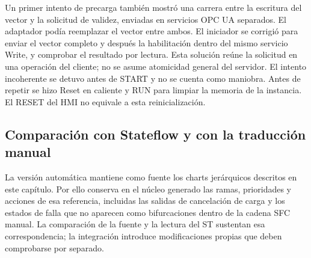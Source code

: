 \documentclass[a4paper,10pt,onecolumn,journal]{ieeeconf}
\numberwithin{equation}{section}
\begin{document}
Un primer intento de precarga también mostró una carrera entre la escritura del vector y la solicitud de validez, enviadas en servicios OPC UA separados. El adaptador podía reemplazar el vector entre ambos. El iniciador se corrigió para enviar el vector completo y después la habilitación dentro del mismo servicio Write, y comprobar el resultado por lectura. Esta solución reúne la solicitud en una operación del cliente; no se asume atomicidad general del servidor. El intento incoherente se detuvo antes de START y no se cuenta como maniobra. Antes de repetir se hizo Reset en caliente y RUN para limpiar la memoria de la instancia. El RESET del HMI no equivale a esta reinicialización.


\subsection{Comparación con Stateflow y con la traducción manual}
La versión automática mantiene como fuente los charts jerárquicos descritos en este capítulo. Por ello conserva en el núcleo generado las ramas, prioridades y acciones de esa referencia, incluidas las salidas de cancelación de carga y los estados de falla que no aparecen como bifurcaciones dentro de la cadena SFC manual. La comparación de la fuente y la lectura del ST sustentan esa correspondencia; la integración introduce modificaciones propias que deben comprobarse por separado.
\end{document}
